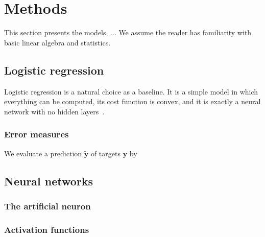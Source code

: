 \section{Methods}
\label{sec:method}


This section presents the models, ... We assume the reader has familiarity
with basic linear algebra and statistics.

\subsection{Logistic regression}\label{subsec:logistic-regression}

Logistic regression is a natural choice as a baseline. It is a simple model in which
everything can be computed, its cost function is convex, and it is exactly a neural
network with no hidden layers~\cite{hjorth-jensen_2026}.

\subsubsection{Error measures}

We evaluate a prediction $\bm{\tilde{y}}$ of targets $\bm{y}$ by

\subsection{Neural networks}\label{subsec:neural-networks}



\subsubsection{The artificial neuron}\label{subsubsec:artificial-neuron}


\subsubsection{Activation functions}


